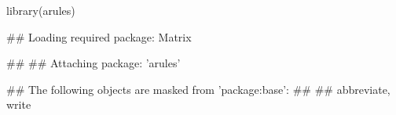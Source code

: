 \documentclass{article}\usepackage[]{graphicx}\usepackage[]{color}
\begin{document}
\begin{Schunk}
% --begin: "casestudy-assoc-arules"
\begin{Sinput}
library(arules)
\end{Sinput}
\begin{Soutput}
## Loading required package: Matrix
\end{Soutput}
\begin{Soutput}
## 
## Attaching package: 'arules'
\end{Soutput}
\begin{Soutput}
## The following objects are masked from 'package:base':
## 
##     abbreviate, write
\end{Soutput}
\end{Schunk}
\end{document}
